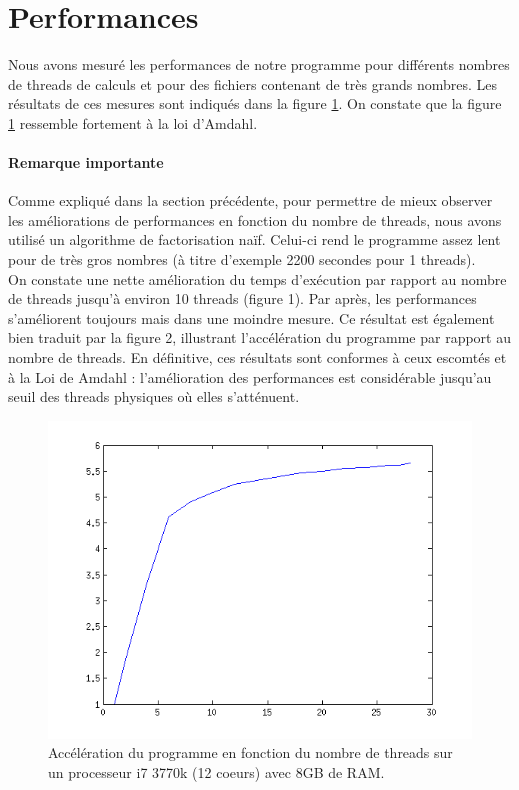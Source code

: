 \documentclass{article}
\begin{document}
\section{Performances}
Nous avons mesuré les performances de notre programme pour différents nombres
de threads de calculs et pour des fichiers contenant de très grands nombres.
Les résultats de ces mesures sont indiqués dans la figure \ref{fig:speedup}.
On constate que la figure \ref{fig:speedup} ressemble fortement à la loi d'Amdahl.

\paragraph{Remarque importante}
Comme expliqué dans la section précédente, pour permettre de mieux observer
les améliorations de performances en fonction du nombre de threads, nous avons
utilisé un algorithme de factorisation naïf. Celui-ci rend le programme assez
lent pour de très gros nombres (à titre d'exemple 2200 secondes pour 1 threads). 
\\
On constate une nette amélioration du temps d'exécution par rapport au nombre de threads jusqu'à environ 10 threads (figure 1). Par après, les performances s'améliorent toujours mais dans une moindre mesure. Ce résultat est également bien traduit par la figure 2, illustrant l'accélération du programme par rapport au nombre de threads. En définitive, ces résultats sont conformes à ceux escomtés et à la Loi de Amdahl : l'amélioration des performances est considérable jusqu'au seuil des threads physiques où elles s'atténuent.

\begin{figure}[ht]
	\centering
	\includegraphics[scale=0.8]{img/speedup.png}
	\caption{Accélération du programme en fonction du nombre de threads sur un processeur i7 3770k (12 coeurs)
	avec 8GB de RAM.}
	\label{fig:speedup}
\end{figure}
\end{document}
